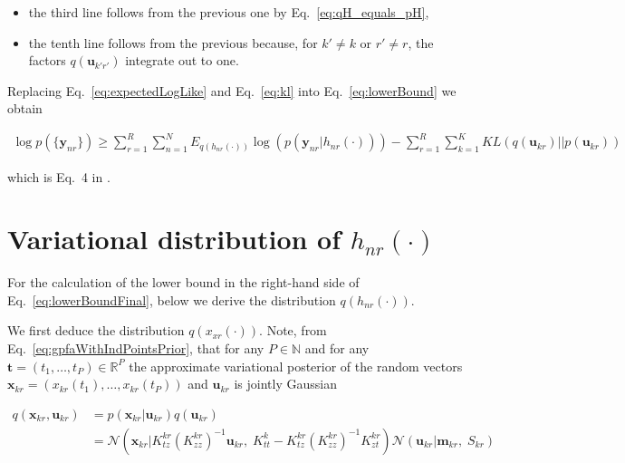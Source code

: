 \documentclass[12pt]{article}
\begin{document}
\begin{itemize}

    \item the third line follows from the previous one by Eq.~\ref{eq:qH_equals_pH},

    \item the tenth line follows from the previous because, for $k'\neq k$ or
        $r'\neq r$, the factors $q(\mathbf{u}_{k'r'})$ integrate out to one.

\end{itemize}

Replacing Eq.~\ref{eq:expectedLogLike} and Eq.~\ref{eq:kl} into Eq.~\ref{eq:lowerBound} we obtain

\begin{align}
    \log p(\{\mathbf{y}_{nr}\})\ge \sum_{r=1}^R\sum_{n=1}^NE_{q(h_{nr}(\cdot))}\log\left(p(\mathbf{y}_{nr}|h_{nr}(\cdot))\right)-\sum_{r=1}^R\sum_{k=1}^K KL(q(\mathbf{u}_{kr})||p(\mathbf{u}_{kr}))
    \label{eq:lowerBoundFinal}
\end{align}

\noindent which is Eq.~4 in \cite{dunckerAndSahani18}.

\section{Variational distribution of $h_{nr}(\cdot)$}

For the calculation of the lower bound in the right-hand side of
Eq.~\ref{eq:lowerBoundFinal}, below we derive the distribution
$q(h_{nr}(\cdot))$.

We first deduce the distribution $q(x_{xr}(\cdot))$. Note, from
Eq.~\ref{eq:gpfaWithIndPointsPrior}, that for any $P\in\mathbb{N}$ and for any
$\mathbf{t}=(t_1,\ldots,t_P)\in\mathbb{R}^P$ the approximate variational
posterior of the random vectors
$\mathbf{x}_{kr}=(x_{kr}(t_1),\ldots,x_{kr}(t_P))$ and $\mathbf{u}_{kr}$ is
jointly Gaussian

\begin{equation}
    \begin{aligned}
        q(\mathbf{x}_{kr},\mathbf{u}_{kr})&=p(\mathbf{x}_{kr}|\mathbf{u}_{kr})q(\mathbf{u}_{kr})\\
                                          &=\mathcal{N}\left(\mathbf{x}_{kr}|K_{tz}^{kr}(K_{zz}^{kr})^{-1}\mathbf{u}_{kr},\;K_{tt}^k-K_{tz}^{kr}(K_{zz}^{kr})^{-1}K_{zt}^{kr}\right)\mathcal{N}(\mathbf{u}_{kr}|\mathbf{m}_{kr},\;S_{kr})
    \end{aligned}
    \label{eq:qxu}
\end{equation}
\end{document}
